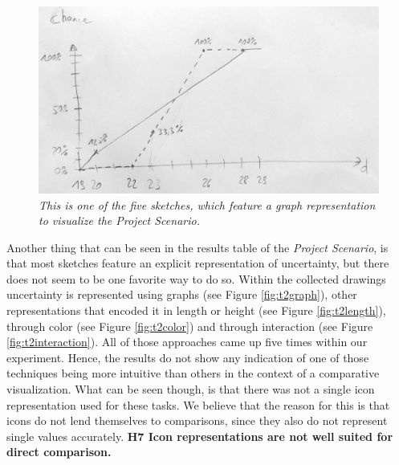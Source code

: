 \begin{figure}[H]
	\centering
	\captionsetup{width=0.8\textwidth}
	\includegraphics[height=0.45\textwidth]{figures/compgraph.jpg}
	\caption{\textit{This is one of the five sketches, which feature a graph representation to visualize the Project Scenario.}}
	\label{fig:compgraph}
\end{figure}

Another thing that can be seen in the results table of the \textit{Project Scenario}, is that most sketches feature an explicit representation of uncertainty, but there does not seem to be one favorite way to do so. Within the collected drawings uncertainty is represented using graphs (see Figure \ref{fig:t2graph}), other representations that encoded it in length or height (see Figure \ref{fig:t2length}), through color (see Figure \ref{fig:t2color}) and through interaction (see Figure \ref{fig:t2interaction}). All of those approaches came up five times within our experiment. Hence, the results do not show any indication of one of those techniques being more intuitive than others in the context of a comparative visualization. What can be seen though, is that there was not a single icon representation used for these tasks. We believe that the reason for this is that icons do not lend themselves to comparisons, since they also do not represent single values accurately. \textbf{H7 Icon representations are not well suited for direct comparison.} \par \medskip


